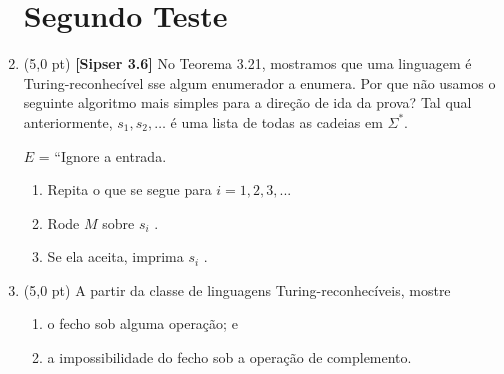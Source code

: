 \documentclass[12pt,a4paper,oneside]{article}
\begin{document}
\begin{enumerate}
	
	\section*{Segundo Teste}
	
	\item (5,0 pt)  {\bf [Sipser 3.6]} No Teorema 3.21, mostramos que uma linguagem é Turing-reconhecível sse algum enumerador a enumera. Por que não usamos o seguinte algoritmo mais simples
	para a direção de ida da prova? Tal qual anteriormente, $s_1, s_2, \ldots$ é uma lista de todas as cadeias em $\Sigma^*$.
	
	$E$ = ``Ignore a entrada.
	
	\begin{enumerate}
		\item Repita o que se segue para $i = 1,2,3,...$
		\item Rode $M$ sobre $s_i$ .
		\item Se ela aceita, imprima $s_i$ .
	\end{enumerate}

	\item (5,0 pt) A partir da classe de linguagens Turing-reconhecíveis, mostre 
	\begin{enumerate}
		\item o fecho sob alguma operação; e
		\item a impossibilidade do fecho sob a operação de complemento.
	\end{enumerate}
	
	

\end{enumerate}
\end{document}
